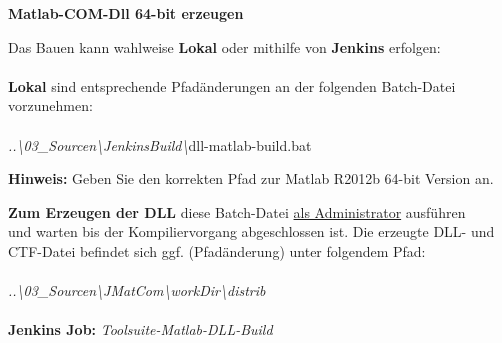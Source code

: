 \documentclass[a4paper,11pt]{article}
\begin{document}
\begin{buildDll}
	\item \textbf{Matlab-COM-Dll 64-bit erzeugen}
	\begin{buildDll}
	\item Das Bauen kann wahlweise \textbf{Lokal} oder mithilfe von \textbf{Jenkins} erfolgen:
	\\
	\\ \textbf{Lokal} sind entsprechende Pfadänderungen an der folgenden Batch-Datei vorzunehmen:
	\\
	\\ \hspace*{5mm} \textit{..\textbackslash{}03\_Sourcen\textbackslash{}JenkinsBuild\textbackslash{}}dll-matlab-build.bat
	\\
		\begin{buildDll}
			\item \textbf{Hinweis:} Geben Sie den korrekten Pfad zur Matlab R2012b 64-bit Version an.
			\\
		\end{buildDll}
	\textbf{Zum Erzeugen der DLL} diese Batch-Datei \uline{als Administrator} ausführen 
	\\ und warten bis der Kompiliervorgang abgeschlossen ist. Die erzeugte DLL- und CTF-Datei
	   befindet sich ggf. (Pfadänderung) unter folgendem Pfad: 
	\\ \\
	   \hspace*{5mm} \textit{..\textbackslash{}03\_Sourcen\textbackslash{}JMatCom\textbackslash{}workDir\textbackslash{}distrib  }
	\\ \\
	\textbf{Jenkins Job:} \textit{Toolsuite-Matlab-DLL-Build}
	\\
	\end{buildDll}
\end{buildDll}

\newpage
\end{document}
